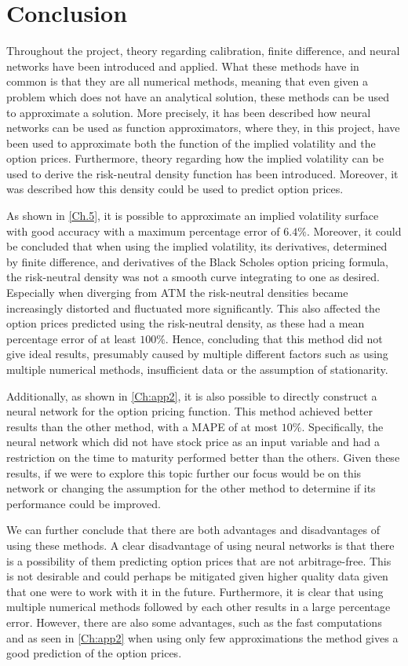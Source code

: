 \chapter{Conclusion}\label{Ch.Conclusion}
Throughout the project, theory regarding calibration, finite difference, and neural networks have been introduced and applied. What these methods have in common is that they are all numerical methods, meaning that even given a problem which does not have an analytical solution, these methods can be used to approximate a solution. More precisely, it has been described how neural networks can be used as function approximators, where they, in this project, have been used to approximate both the function of the implied volatility and the option prices. Furthermore, theory regarding how the implied volatility can be used to derive the risk-neutral density function has been introduced. Moreover, it was described how this density could be used to predict option prices. 

As shown in \autoref{Ch.5}, it is possible to approximate an implied volatility surface with good accuracy with a maximum percentage error of $6.4\%$. Moreover, it could be concluded that when using the implied volatility, its derivatives, determined by finite difference, and derivatives of the Black Scholes option pricing formula, the risk-neutral density was not a smooth curve integrating to one as desired. Especially when diverging from ATM the risk-neutral densities became increasingly distorted and fluctuated more significantly. This also affected the option prices predicted using the risk-neutral density, as these had a mean percentage error of at least $100\%$. Hence, concluding that this method did not give ideal results, presumably caused by multiple different factors such as using multiple numerical methods, insufficient data or the assumption of stationarity.

Additionally, as shown in \autoref{Ch:app2}, it is also possible to directly construct a neural network for the option pricing function. This method achieved better results than the other method, with a MAPE of at most $10\%$. Specifically, the neural network which did not have stock price as an input variable and had a restriction on the time to maturity performed better than the others. Given these results, if we were to explore this topic further our focus would be on this network or changing the assumption for the other method to determine if its performance could be improved.

We can further conclude that there are both advantages and disadvantages of using these methods. A clear disadvantage of using neural networks is that there is a possibility of them predicting option prices that are not arbitrage-free. This is not desirable and could perhaps be mitigated given higher quality data given that one were to work with it in the future. Furthermore, it is clear that using multiple numerical methods followed by each other results in a large percentage error. However, there are also some advantages, such as the fast computations and as seen in \autoref{Ch:app2} when using only few approximations the method gives a good prediction of the option prices. 

